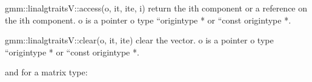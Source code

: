 \documentclass[a4paper,11pt,english]{sphinxmanual}
\begin{document}
\begin{sphinxVerbatim}[commandchars=\\\{\}]
gmm::linalg\PYGZus{}traits\PYGZlt{}V\PYGZgt{}::access(o, it, ite, i) \PYGZhy{}\PYGZhy{}\PYGZgt{} return the ith component or a
                                        reference on the ith component. o is a
                                        pointer o type ``origin\PYGZus{}type *\PYGZsq{}\PYGZsq{} or
                                        ``const origin\PYGZus{}type *\PYGZsq{}\PYGZsq{}.

gmm::linalg\PYGZus{}traits\PYGZlt{}V\PYGZgt{}::clear(o, it, ite) \PYGZhy{}\PYGZhy{}\PYGZgt{} clear the vector. o is a
                                        pointer o type ``origin\PYGZus{}type *\PYGZsq{}\PYGZsq{} or
                                        ``const origin\PYGZus{}type *\PYGZsq{}\PYGZsq{}.
\end{sphinxVerbatim}

and for a matrix type:
\end{document}
